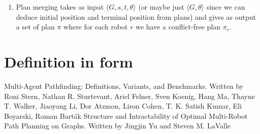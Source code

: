 \documentclass{llncs}
\begin{document}
\begin{enumerate}
    \item Plan merging takes as input \(\langle G,s,t, \theta \rangle \) (or maybe just \(\langle G,\theta \rangle \) since we can deduce initial position and terminal position from plans) and gives as output a set of plan \(\pi\) where for each robot \(r\) we have a conflict-free plan \(\pi_r\).
\end{enumerate}



\section{Definition in form}





\newpage
\begin{thebibliography}{2}
Multi-Agent Pathfinding: Definitions, Variants, and Benchmarks. Written by Roni Stern, Nathan R. Sturtevant, Ariel Felner, Sven Koenig, Hang Ma, Thayne T. Walker, Jiaoyang Li, Dor Atzmon, Liron Cohen, T. K. Satish Kumar, Eli Boyarski, Roman Barták
Structure and Intractability of Optimal Multi-Robot Path Planning on Graphs. Written by Jingjin Yu and Steven M. LaValle

\end{thebibliography}
\end{document}
